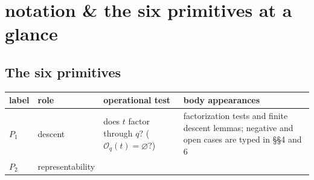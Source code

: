 \hypertarget{notation-the-six-primitives-at-a-glance}{%
\section{notation \& the six primitives at a glance}\label{notation-the-six-primitives-at-a-glance}}

\hypertarget{the-six-primitives}{%
\subsection{The six primitives}\label{the-six-primitives}}

\begin{longtable}[]{@{}llll@{}}
\toprule
\begin{minipage}[b]{0.11\columnwidth}\raggedright
label\strut
\end{minipage} & \begin{minipage}[b]{0.20\columnwidth}\raggedright
role\strut
\end{minipage} & \begin{minipage}[b]{0.37\columnwidth}\raggedright
operational test\strut
\end{minipage} & \begin{minipage}[b]{0.22\columnwidth}\raggedright
body appearances\strut
\end{minipage}\tabularnewline
\midrule
\endhead
\begin{minipage}[t]{0.11\columnwidth}\raggedright
\(P_1\)\strut
\end{minipage} & \begin{minipage}[t]{0.20\columnwidth}\raggedright
descent\strut
\end{minipage} & \begin{minipage}[t]{0.37\columnwidth}\raggedright
does \(t\) factor through \(q\)? (\(\mathcal O_q(t) = \varnothing\)?)\strut
\end{minipage} & \begin{minipage}[t]{0.22\columnwidth}\raggedright
factorization tests and finite descent lemmas; negative and open cases are typed in §§4 and 6\strut
\end{minipage}\tabularnewline
\begin{minipage}[t]{0.11\columnwidth}\raggedright
\(P_2\)\strut
\end{minipage} & \begin{minipage}[t]{0.20\columnwidth}\raggedright
representability\strut
\end{minipage} & \begin{minipage}[t]{0.37\columnwidth}\raggedright

\end{minipage}
\end{longtable}
